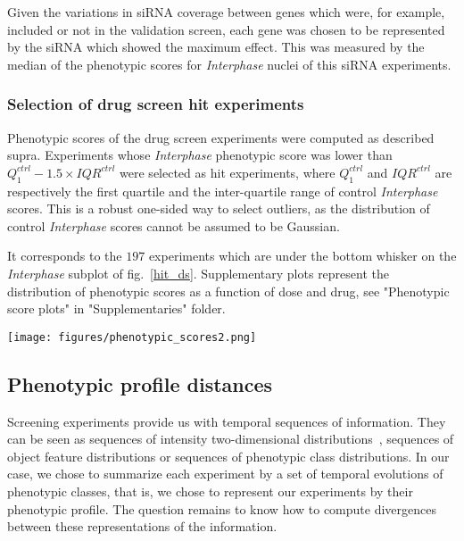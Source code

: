 Given the variations in siRNA coverage between genes which were, for example, included or not in the validation screen, each gene was chosen to be represented by the siRNA which showed the maximum effect. This was measured by the median of the phenotypic scores for \textit{Interphase} nuclei of this siRNA experiments.


\subsubsection{Selection of drug screen hit experiments}
\label{sec:selection_ds}
Phenotypic scores of the drug screen experiments were computed as described supra. Experiments whose \textit{Interphase} phenotypic score was lower than $Q_1^{ctrl} - 1.5\times IQR^{ctrl}$ were selected as hit experiments, where $Q_1^{ctrl}$ and $IQR^{ctrl}$ are respectively the first quartile and the inter-quartile range of control \textit{Interphase} scores. This is a robust one-sided way to select outliers, as the distribution of control \textit{Interphase} scores cannot be assumed to be Gaussian. 

It corresponds to the $197$ experiments which are under the bottom whisker on the \textit{Interphase} subplot of fig.~\ref{hit_ds}. Supplementary plots represent the distribution of phenotypic scores as a function of dose and drug, see "Phenotypic score plots" in "Supplementaries" folder.

\begin{figure*}[ht!]
\centerline{\texttt{[image: figures/phenotypic\_scores2.png]}
}
\caption{Distributions of phenotypic scores from the drug screen experiments. Each boxplot corresponds to the distribution of control phenotypic scores, whereas each red dot is an experiment in which cells were exposed to a drug.}
\label{hit_ds}
\end{figure*}
\subsection{Phenotypic profile distances}
Screening experiments provide us with temporal sequences of information. They can be seen as sequences of intensity two-dimensional distributions~\cite{pmid22743764}, sequences of object feature distributions or sequences of phenotypic class distributions. In our case, we chose to summarize each experiment by a set of temporal evolutions of phenotypic classes, that is, we chose to represent our experiments by their phenotypic profile. The question remains to know how to compute divergences between these representations of the information.

